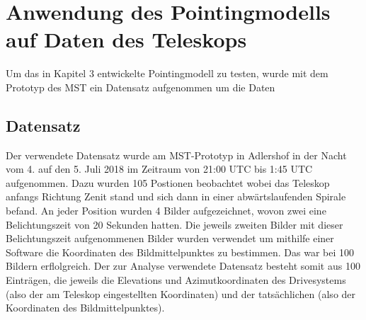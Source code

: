 \chapter{Anwendung des Pointingmodells auf Daten des Teleskops}
Um das in Kapitel 3 entwickelte Pointingmodell zu testen, wurde mit dem Prototyp des MST ein Datensatz aufgenommen um die Daten
\section{Datensatz}
Der verwendete Datensatz wurde am MST-Prototyp in Adlershof in der Nacht vom 4. auf den 5. Juli 2018 im Zeitraum von 21:00 UTC bis 1:45 UTC aufgenommen. Dazu wurden 105 Postionen beobachtet wobei das Teleskop anfangs Richtung Zenit stand und sich dann in einer abwärtslaufenden Spirale befand. An jeder Position wurden 4 Bilder aufgezeichnet, wovon zwei eine Belichtungszeit von 20 Sekunden hatten. Die jeweils zweiten Bilder mit dieser Belichtungszeit aufgenommenen Bilder wurden verwendet um mithilfe einer Software die Koordinaten des Bildmittelpunktes zu bestimmen. Das war bei 100 Bildern erflolgreich. Der zur Analyse verwendete Datensatz besteht somit aus 100 Einträgen, die jeweils die Elevations und Azimutkoordinaten des Drivesystems (also der am Teleskop eingestellten Koordinaten) und der tatsächlichen (also der Koordinaten des Bildmittelpunktes).
